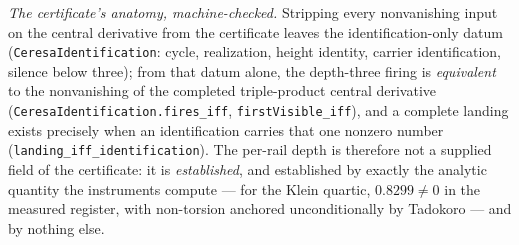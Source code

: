 \documentclass[11pt]{article}
\theoremstyle{definition}
\theoremstyle{remark}
\begin{document}
\noindent\emph{The certificate's anatomy, machine-checked.} Stripping every
nonvanishing input on the central derivative from the certificate leaves the
identification-only datum (\texttt{CeresaIdentification}: cycle, realization,
height identity, carrier identification, silence below three); from that
datum alone, the depth-three firing is \emph{equivalent} to the nonvanishing
of the completed triple-product central derivative
(\texttt{CeresaIdentification.fires\_iff}, \texttt{firstVisible\_iff}), and a
complete landing exists precisely when an identification carries that one
nonzero number (\texttt{landing\_iff\_identification}). The per-rail depth is
therefore not a supplied field of the certificate: it is \emph{established},
and established by exactly the analytic quantity the instruments compute ---
for the Klein quartic, $0.8299\ne0$ in the measured register, with
non-torsion anchored unconditionally by Tadokoro \cite{Tadokoro} --- and by
nothing else.
\end{document}
